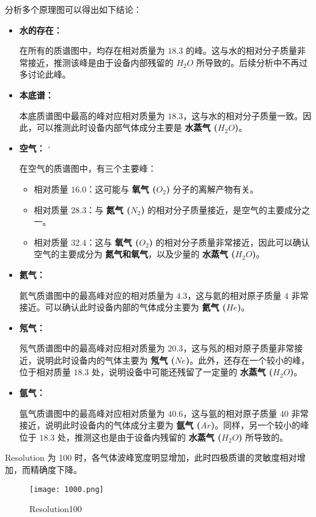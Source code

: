 \documentclass[dvipsnames, svgnames,a4paper,11pt]{article}
\begin{document}
分析多个原理图可以得出如下结论：

\begin{itemize}
    \item \textbf{水的存在：} 
    
    在所有的质谱图中，均存在相对质量为 \textbf{$18.3$} 的峰。这与水的相对分子质量非常接近，推测该峰是由于设备内部残留的 \textbf{$H_2O$} 所导致的。后续分析中不再过多讨论此峰。

    \item \textbf{本底谱：}  
    
    本底质谱图中最高的峰对应相对质量为 \textbf{$18.3$}，这与水的相对分子质量一致。因此，可以推测此时设备内部气体成分主要是 \textbf{水蒸气 ($H_2O$)}。

    \item \textbf{空气：}  ‘
    
    在空气的质谱图中，有三个主要峰：
    \begin{itemize}
        \item 相对质量 \textbf{$16.0$}：这可能与 \textbf{氧气 ($O_2$)} 分子的离解产物有关。
        \item 相对质量 \textbf{$28.3$}：与 \textbf{氮气 ($N_2$)} 的相对分子质量接近，是空气的主要成分之一。
        \item 相对质量 \textbf{$32.4$}：这与 \textbf{氧气 ($O_2$)} 的相对分子质量非常接近，因此可以确认空气的主要成分为 \textbf{氮气和氧气}，以及少量的 \textbf{水蒸气 ($H_2O$)}。
    \end{itemize}

    \item \textbf{氦气：}  
    
    氦气质谱图中的最高峰对应的相对质量为 \textbf{$4.3$}，这与氦的相对原子质量 \textbf{$4$} 非常接近。可以确认此时设备内部的气体成分主要为 \textbf{氦气 ($He$)}。

    \item \textbf{氖气：}  
    
    氖气质谱图中的最高峰对应相对质量为 \textbf{$20.3$}，这与氖的相对原子质量非常接近，说明此时设备内的气体主要为 \textbf{氖气 ($Ne$)}。此外，还存在一个较小的峰，位于相对质量 \textbf{$18.3$} 处，说明设备中可能还残留了一定量的 \textbf{水蒸气 ($H_2O$)}。

    \item \textbf{氩气：}  
    
    氩气质谱图中的最高峰对应相对质量为 \textbf{$40.6$}，这与氩的相对原子质量 \textbf{$40$} 非常接近，说明此时设备内的气体成分主要为 \textbf{氩气 ($Ar$)}。同样，另一个较小的峰位于 \textbf{$18.3$} 处，推测这也是由于设备内残留的 \textbf{水蒸气 ($H_2O$)} 所导致的。

\end{itemize}
Resolution 为 100 时，各气体波峰宽度明显增加，此时四极质谱的灵敏度相对增加，而精确度下降。
\begin{figure}[{H}]
	\centering
	\texttt{[image: 1000.png]}
	\caption{Resolution100}
	\label{}
\end{figure}
\end{document}
